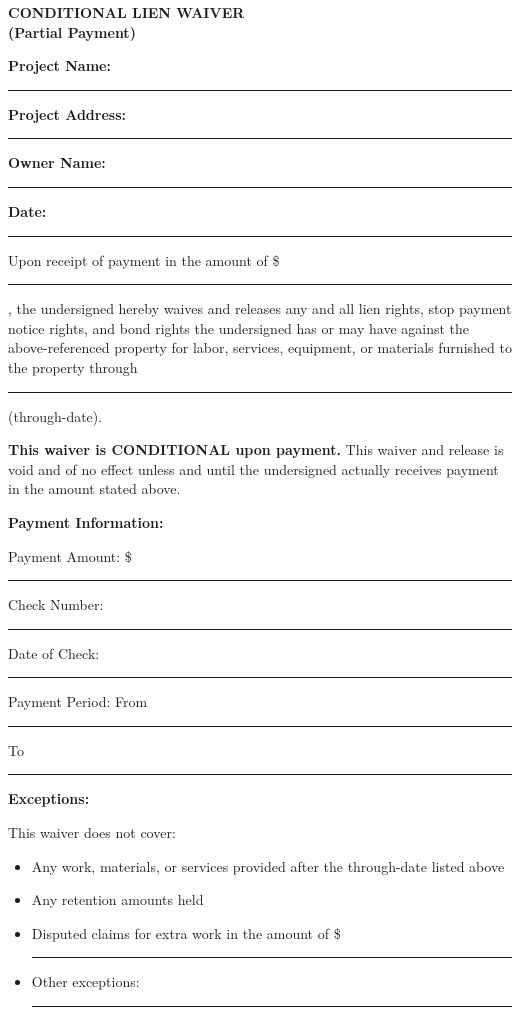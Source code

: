 \documentclass[11pt,letterpaper]{article}
\begin{document}
\begin{center}
\textbf{\Large CONDITIONAL LIEN WAIVER}\\
\textbf{\Large (Partial Payment)}
\end{center}

\vspace{12pt}

\textbf{Project Name:} \rule{9cm}{0.4pt}

\textbf{Project Address:} \rule{9cm}{0.4pt}

\textbf{Owner Name:} \rule{9cm}{0.4pt}

\textbf{Date:} \rule{4cm}{0.4pt}

\vspace{6pt}

Upon receipt of payment in the amount of \$ \rule{4cm}{0.4pt}, the undersigned hereby waives and releases any and all lien rights, stop payment notice rights, and bond rights the undersigned has or may have against the above-referenced property for labor, services, equipment, or materials furnished to the property through \rule{4cm}{0.4pt} (through-date).

\vspace{6pt}

\textbf{This waiver is CONDITIONAL upon payment.} This waiver and release is void and of no effect unless and until the undersigned actually receives payment in the amount stated above.

\vspace{6pt}

\textbf{Payment Information:}

Payment Amount: \$ \rule{5cm}{0.4pt}

Check Number: \rule{4cm}{0.4pt}

Date of Check: \rule{4cm}{0.4pt}

Payment Period: From \rule{3cm}{0.4pt} To \rule{3cm}{0.4pt}

\vspace{6pt}

\textbf{Exceptions:}

This waiver does not cover:
\begin{itemize}[leftmargin=0.5in]
\item Any work, materials, or services provided after the through-date listed above
\item Any retention amounts held
\item Disputed claims for extra work in the amount of \$ \rule{3cm}{0.4pt}
\item Other exceptions: \rule{7cm}{0.4pt}
\end{itemize}
\end{document}
